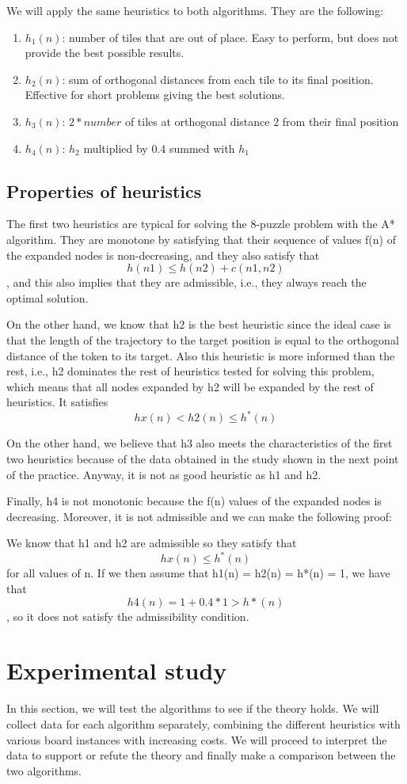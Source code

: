 \documentclass[runningheads]{llncs}
\begin{document}
We will apply the same heuristics to both algorithms. They are the following:
\begin{enumerate}
    \item $h_1(n)$: number of tiles that are out of place. Easy to perform, but does not provide the best possible results.
    \item $h_2(n)$: sum of orthogonal distances from each tile to its final position. Effective for short problems giving the best solutions.
    \item $h_3(n)$: $2*number$ of tiles at orthogonal distance 2 from their final position
    \item $h_4(n)$: $h_2$ multiplied by 0.4 summed with $h_1$
\end{enumerate}
\subsection{Properties of heuristics}
The first two heuristics are typical for solving the 8-puzzle problem with 
the A* algorithm. They are monotone by satisfying that their sequence of 
values f(n) of the expanded nodes is non-decreasing, and they also satisfy 
that $$h(n1) \leq h(n2) + c(n1,n2)$$, and this also implies that they are admissible, 
i.e., they always reach the optimal solution.

On the other hand, we know that h2 is the best heuristic since the ideal 
case is that the length of the trajectory to the target position is equal 
to the orthogonal distance of the token to its target. Also this heuristic 
is more informed than the rest, i.e., h2 dominates the rest of heuristics 
tested for solving this problem, which means that all nodes expanded by h2 
will be expanded by the rest of heuristics. It satisfies $$hx(n) < h2(n) \leq h^*(n)$$

On the other hand, we believe that h3 also meets the characteristics 
of the first two heuristics because of the data obtained in the study 
shown in the next point of the practice. Anyway, it is not as good heuristic as h1 and h2.

Finally, h4 is not monotonic because the f(n) values of the expanded 
nodes is decreasing. Moreover, it is not admissible and we can make 
the following proof:

We know that h1 and h2 are admissible so they satisfy that 
$$hx(n) \leq h^*(n)$$ for all values of n. If we then assume that 
h1(n) = h2(n) = h*(n) = 1, we have that $$h4(n) = 1 + 0.4*1 > h*(n)$$, 
so it does not satisfy the admissibility condition. 
\section{Experimental study}
In this section, we will test the algorithms to see if the theory holds.
We will collect data for each algorithm separately, combining the different
heuristics with various board instances with increasing costs. We will proceed to
interpret the data to support or refute the theory and finally make a comparison between the two algorithms.
\end{document}
